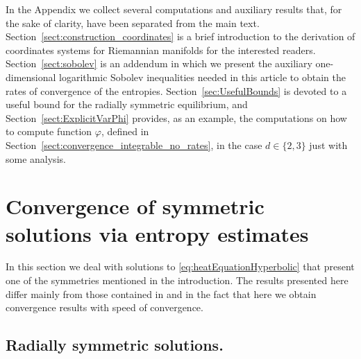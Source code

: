 \documentclass[12pt,longbibliography]{article}
\theoremstyle{definition}
\theoremstyle{remark}
\theoremstyle{example}
\begin{document}
In the Appendix we collect several computations and auxiliary results that, for the sake of clarity, have been separated from the main text. Section~\ref{sect:construction_coordinates} is a brief introduction to the derivation of coordinates systems for Riemannian manifolds for the interested readers. Section~\ref{sect:sobolev} is an addendum in which we present the auxiliary one-dimensional logarithmic Sobolev inequalities needed in this article to obtain the rates of convergence of the entropies. Section~\ref{sec:UsefulBounds} is devoted to a useful bound for the radially symmetric equilibrium, and Section~\ref{sect:ExplicitVarPhi} provides, as an example, the computations on how to compute function \( \varphi \), defined in Section~\ref{sect:convergence_integrable_no_rates}, in the case $d\in\{2,3\}$ just with some analysis.


\section{Convergence of symmetric solutions via entropy estimates}\label{sect:convergence_symmetries}
In this section we deal with solutions to \eqref{eq:heatEquationHyperbolic} that present one of the symmetries mentioned in the introduction. The results presented here differ mainly from those contained in \cite{vazquez1992asymptotic} and \cite{APZ} in the fact that here we obtain convergence results with speed of convergence.

\subsection{Radially symmetric solutions. }\label{sect:elliptic}
\end{document}
